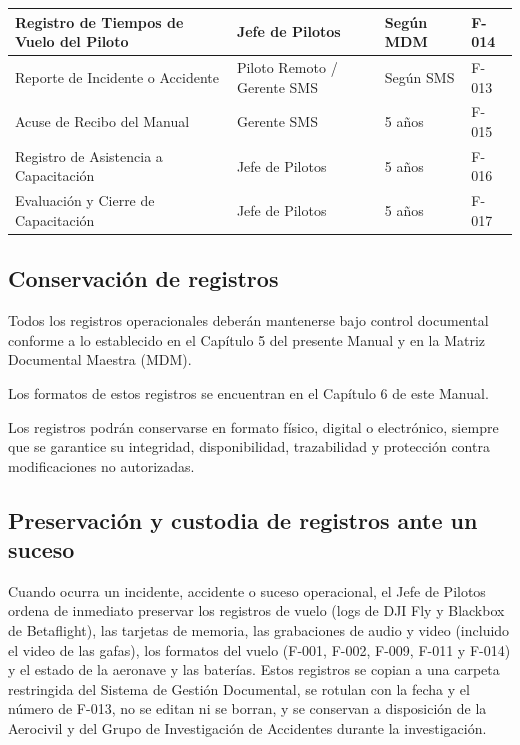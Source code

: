 \begin{longtable}{|p{4cm}|p{5cm}|p{3cm}|p{2cm}|}
Registro de Tiempos de Vuelo del Piloto &
Jefe de Pilotos &
Según MDM &
F-014

\\ \hline

Reporte de Incidente o Accidente &
Piloto Remoto / Gerente SMS &
Según SMS &
F-013

\\ \hline

Acuse de Recibo del Manual &
Gerente SMS &
5 años &
F-015

\\ \hline

Registro de Asistencia a Capacitación &
Jefe de Pilotos &
5 años &
F-016

\\ \hline

Evaluación y Cierre de Capacitación &
Jefe de Pilotos &
5 años &
F-017

\\ \hline

\end{longtable}


\subsection{Conservación de registros}

Todos los registros operacionales deberán mantenerse bajo control documental conforme a lo establecido en el Capítulo 5 del presente Manual y en la Matriz Documental Maestra (MDM).

Los formatos de estos registros se encuentran en el Capítulo 6 de este Manual.

Los registros podrán conservarse en formato físico, digital o electrónico, siempre que se garantice su integridad, disponibilidad, trazabilidad y protección contra modificaciones no autorizadas.


\subsection{Preservación y custodia de registros ante un suceso}

Cuando ocurra un incidente, accidente o suceso operacional, el Jefe de Pilotos ordena de inmediato preservar los registros de vuelo (logs de DJI Fly y Blackbox de Betaflight), las tarjetas de memoria, las grabaciones de audio y video (incluido el video de las gafas), los formatos del vuelo (F-001, F-002, F-009, F-011 y F-014) y el estado de la aeronave y las baterías. Estos registros se copian a una carpeta restringida del Sistema de Gestión Documental, se rotulan con la fecha y el número de F-013, no se editan ni se borran, y se conservan a disposición de la Aerocivil y del Grupo de Investigación de Accidentes durante la investigación.

